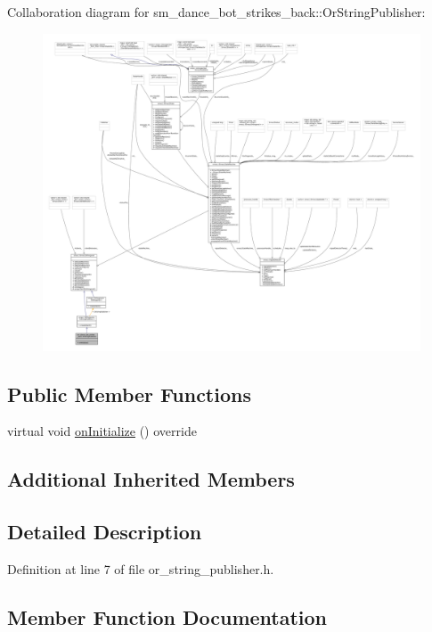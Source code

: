 Collaboration diagram for sm\+\_\+dance\+\_\+bot\+\_\+strikes\+\_\+back\+:\+:Or\+String\+Publisher\+:
\nopagebreak
\begin{figure}[H]
\begin{center}
\leavevmode
\includegraphics[width=350pt]{classsm__dance__bot__strikes__back_1_1OrStringPublisher__coll__graph}
\end{center}
\end{figure}
\subsection*{Public Member Functions}
\begin{DoxyCompactItemize}
\item 
virtual void \hyperlink{classsm__dance__bot__strikes__back_1_1OrStringPublisher_a40cf07dbbbdd556db6582910b5c8db6a}{on\+Initialize} () override
\end{DoxyCompactItemize}
\subsection*{Additional Inherited Members}


\subsection{Detailed Description}


Definition at line 7 of file or\+\_\+string\+\_\+publisher.\+h.



\subsection{Member Function Documentation}
